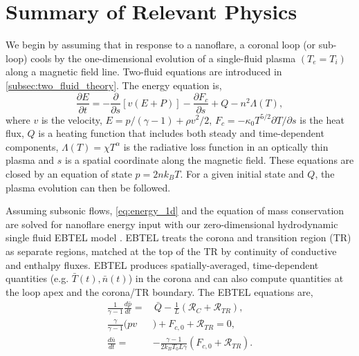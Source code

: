 \documentclass[apj]{emulateapj}
\begin{document}
	\section{Summary of Relevant Physics}
	\label{sec:phys_sum}
	\par We begin by assuming that in response to a nanoflare, a coronal loop (or sub-loop) cools by the one-dimensional evolution of a single-fluid plasma $(T_e = T_i)$ along a magnetic field line. Two-fluid equations are introduced in \autoref{subsec:two_fluid_theory}. The energy equation is,
	\begin{equation}
		\label{eq:energy_1d}
		\frac{\partial E}{\partial t} = -\frac{\partial}{\partial s}[v(E+P)] - \frac{\partial F_c}{\partial s} + Q - n^2\Lambda(T),
	\end{equation}
where $v$ is the velocity, $E=p/(\gamma -1) + \rho v^2/2$, $F_c=-\kappa_0 T^{5/2}\partial T/\partial s$ is the heat flux, $Q$ is a heating function that includes both steady and time-dependent components, $\Lambda(T)=\chi T^{\alpha}$ is the radiative loss function in an optically thin plasma \citep[e.g.][]{klimchuk_highly_2008} and $s$ is a spatial coordinate along the magnetic field. These equations are closed by an equation of state $p=2nk_BT$. For a given initial state and $Q$, the plasma evolution can then be followed. 
	\par Assuming subsonic flows, \autoref{eq:energy_1d} and the equation of mass conservation are solved for nanoflare energy input with our zero-dimensional hydrodynamic single fluid EBTEL model \citep[see][for derivations]{klimchuk_highly_2008,cargill_enthalpy-based_2012,cargill_enthalpy-based_2012-1,cargill_modelling_2015}. EBTEL treats the corona and transition region (TR) as separate regions, matched at the top of the TR by continuity of conductive and enthalpy fluxes. EBTEL produces spatially-averaged, time-dependent quantities (e.g. $\bar{T}(t),\bar{n}(t)$) in the corona and can also compute quantities at the loop apex and the corona/TR boundary. The EBTEL equations are,
	\begin{align}
		\frac{1}{\gamma - 1}\frac{d\bar{p}}{dt} =& \,\bar{Q} - \frac{1}{L}(\mathcal{R}_C + \mathcal{R}_{TR}), \label{eq:energy_0d} \\
		\frac{\gamma}{\gamma - 1}(pv&) + F_{c,0} + \mathcal{R}_{TR} = 0, \label{eq:tr_energy_0d} \\
		\frac{d\bar{n}}{dt} =& -\frac{\gamma - 1}{2k_BT_0L\gamma}(F_{c,0} + \mathcal{R}_{TR}).\label{eq:mass_0d}
	\end{align}
\end{document}
